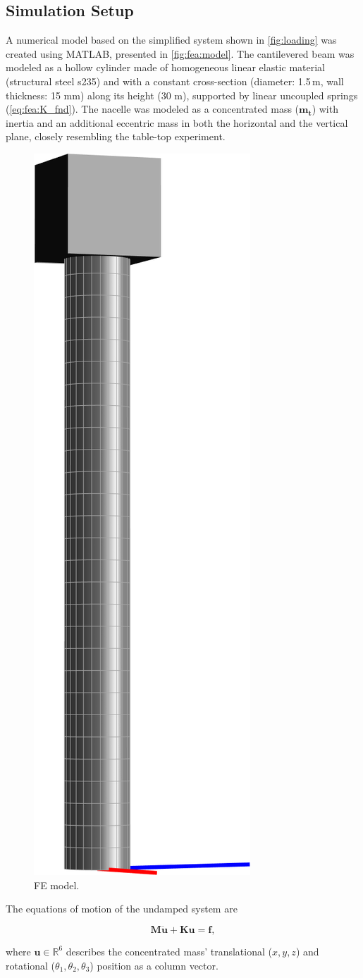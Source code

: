 \documentclass{article}
\begin{document}
\label{sec:simulations}



\subsection{Simulation Setup}

A numerical model based on the simplified system shown in \autoref{fig:loading} was created using MATLAB, presented in \autoref{fig:fea:model}. The cantilevered beam was modeled as a hollow cylinder made of  homogeneous linear elastic material (structural steel s235) and with a constant cross-section (diameter: 1.5\,m, wall thickness: 15 mm) along its height (30 m), supported by linear uncoupled springs (\autoref{eq:fea:K_fnd}). The nacelle was modeled as a concentrated mass ($\mathbf{m_{t}}$) with inertia and an additional eccentric mass in both the horizontal and the vertical plane, closely resembling the table-top experiment.

\begin{figure}[ht!]
    \centering
    \includegraphics[width=0.15\linewidth]{figures/FEModel.png}
    \caption{FE model.}
    \label{fig:fea:model}
\end{figure}

The equations of motion of the undamped system are

\begin{equation}
    \mathbf{M\ddot{\mathbf{u}}}+\mathbf{K}\mathbf{u} = \mathbf{f},
    \label{eq:fea:system}
\end{equation}

where $\mathbf{u} \in \mathbb{R}^6$ describes the concentrated mass' translational ($x,y,z$) and rotational ($\theta_1, \theta_2, \theta_3$) position as a column vector.
\end{document}
